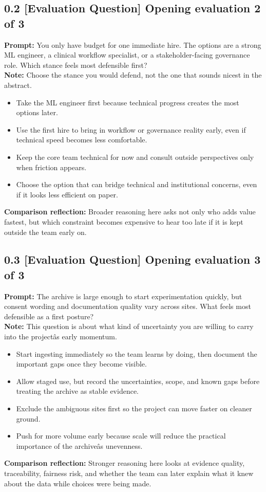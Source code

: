 \documentclass[11pt]{article}
\begin{document}
\subsection*{0.2 [Evaluation Question] Opening evaluation 2 of 3}
\textbf{Prompt:} You only have budget for one immediate hire. The options are a strong ML engineer, a clinical workflow specialist, or a stakeholder-facing governance role. Which stance feels most defensible first?\\
\textbf{Note:} Choose the stance you would defend, not the one that sounds nicest in the abstract.
\begin{itemize}
\item Take the ML engineer first because technical progress creates the most options later.
\item Use the first hire to bring in workflow or governance reality early, even if technical speed becomes less comfortable.
\item Keep the core team technical for now and consult outside perspectives only when friction appears.
\item Choose the option that can bridge technical and institutional concerns, even if it looks less efficient on paper.
\end{itemize}
\textbf{Comparison reflection:} Broader reasoning here asks not only who adds value fastest, but which constraint becomes expensive to hear too late if it is kept outside the team early on.
\subsection*{0.3 [Evaluation Question] Opening evaluation 3 of 3}
\textbf{Prompt:} The archive is large enough to start experimentation quickly, but consent wording and documentation quality vary across sites. What feels most defensible as a first posture?\\
\textbf{Note:} This question is about what kind of uncertainty you are willing to carry into the projectâs early momentum.
\begin{itemize}
\item Start ingesting immediately so the team learns by doing, then document the important gaps once they become visible.
\item Allow staged use, but record the uncertainties, scope, and known gaps before treating the archive as stable evidence.
\item Exclude the ambiguous sites first so the project can move faster on cleaner ground.
\item Push for more volume early because scale will reduce the practical importance of the archiveâs unevenness.
\end{itemize}
\textbf{Comparison reflection:} Stronger reasoning here looks at evidence quality, traceability, fairness risk, and whether the team can later explain what it knew about the data while choices were being made.
\end{document}
